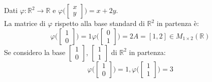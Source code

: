 \begin{example}
	Dati $\varphi: \mathbb{R}^2 \rightarrow \mathbb{R}$ e $\varphi \bigg( \begin{bmatrix}
		x \\ y
	\end{bmatrix}\bigg) = x + 2y$. \\
La matrice di $\varphi$ rispetto alla base standard di $\mathbb{R}^2$ in partenza è:
\begin{equation*}
	\varphi\bigg(\begin{bmatrix}
		1 \\ 0
	\end{bmatrix}\bigg) = 1
	\varphi\bigg(\begin{bmatrix}
		0 \\ 1
	\end{bmatrix}\bigg) = 2
	A = [1, 2] \in M_{1 \times 2}(\mathbb{R})
\end{equation*}
Se considero la base $\begin{bmatrix}
	1 \\ 0
\end{bmatrix}$, $\begin{bmatrix}
1 \\ 1
\end{bmatrix}$ di $\mathbb{R}^2$ in partenza:
\begin{equation*}
	\varphi\bigg(\begin{bmatrix}
		1 \\ 0
	\end{bmatrix}\bigg) = 1,
	\varphi\bigg(\begin{bmatrix}
		1 \\ 1
	\end{bmatrix}\bigg) = 3
	
\end{equation*}
\end{example}